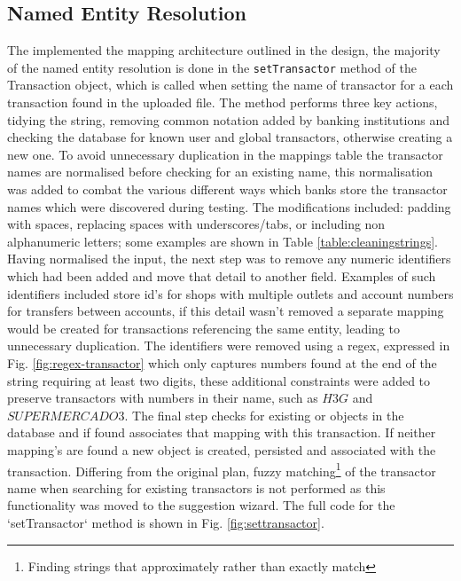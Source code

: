 \subsection{Named Entity Resolution}
The implemented the mapping architecture outlined in the design, the majority of the named entity resolution is done in the \lstinline{setTransactor} method of the Transaction object, which is called when setting the name of transactor for a each transaction found in the uploaded file.   
% 
The method performs three key actions, tidying the string, removing common notation added by banking institutions and checking the database for known user and global transactors, otherwise creating a new one.
% 
To avoid unnecessary duplication in the mappings table the \gls{transactor} names are normalised before checking for an existing name, this normalisation was added to combat the various different ways which banks store the transactor names which were discovered during testing. The modifications included: padding with spaces, replacing spaces with underscores/tabs, or including non alphanumeric letters; some examples are shown in Table \ref{table:cleaningstrings}.
%
Having normalised the input, the next step was to remove any numeric identifiers which had been added and move that detail to another field. Examples of such identifiers included store id's for shops with multiple outlets and account numbers for transfers between accounts, if this detail wasn't removed a separate mapping would be created for transactions referencing the same entity, leading to unnecessary duplication. The identifiers were removed using a regex, expressed in Fig. \ref{fig:regex-transactor} which only captures numbers found at the end of the string requiring at least two digits, these additional constraints were added to preserve \glspl{transactor} with numbers in their name, such as \inlinetext$H3G$ and \inlinetext$SUPERMERCADO 3$.
%
The final step checks for existing  or  objects in the database and if found associates that mapping with this transaction. If neither mapping's are found a new  object is created, persisted and associated with the transaction. Differing from the original plan, fuzzy matching\footnote{ Finding strings that approximately rather than exactly match} of the transactor name when searching for existing transactors is not performed as this functionality was moved to the suggestion wizard.
%
The full code for the `setTransactor` method is shown in Fig. \ref{fig:settransactor}.

